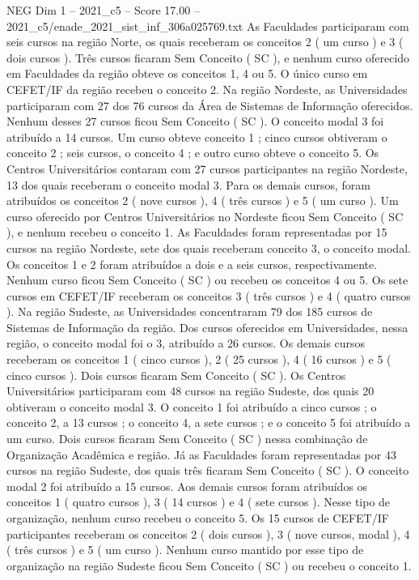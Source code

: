\begin{textsample}{NEG Dim 1 – 2021\_c5 – Score 17.00 – 2021\_c5/enade\_2021\_sist\_inf\_306a025769.txt}
As Faculdades participaram com seis cursos na região Norte, os quais receberam os conceitos 2 ( um curso ) e 3 ( dois cursos ).
Três cursos ficaram Sem Conceito ( SC ), e nenhum curso oferecido em Faculdades da região obteve os conceitos 1, 4 ou 5.
O único curso em CEFET/IF da região recebeu o conceito 2.
Na região Nordeste, as Universidades participaram com 27 dos 76 cursos da Área de Sistemas de Informação oferecidos.
Nenhum desses 27 cursos ficou Sem Conceito ( SC ).
O conceito modal 3 foi atribuído a 14 cursos.
Um curso obteve conceito 1 ; cinco cursos obtiveram o conceito 2 ; seis cursos, o conceito 4 ; e outro curso obteve o conceito 5.
Os Centros Universitários contaram com 27 cursos participantes na região Nordeste, 13 dos quais receberam o conceito modal 3.
Para os demais cursos, foram atribuídos os conceitos 2 ( nove cursos ), 4 ( três cursos ) e 5 ( um curso ).
Um curso oferecido por Centros Universitários no Nordeste ficou Sem Conceito ( SC ), e nenhum recebeu o conceito 1.
As Faculdades foram representadas por 15 cursos na região Nordeste, sete dos quais receberam conceito 3, o conceito modal.
Os conceitos 1 e 2 foram atribuídos a dois e a seis cursos, respectivamente.
Nenhum curso ficou Sem Conceito ( SC ) ou recebeu os conceitos 4 ou 5.
Os sete cursos em CEFET/IF receberam os conceitos 3 ( três cursos ) e 4 ( quatro cursos ).
Na região Sudeste, as Universidades concentraram 79 dos 185 cursos de Sistemas de Informação da região.
Dos cursos oferecidos em Universidades, nessa região, o conceito modal foi o 3, atribuído a 26 cursos.
Os demais cursos receberam os conceitos 1 ( cinco cursos ), 2 ( 25 cursos ), 4 ( 16 cursos ) e 5 ( cinco cursos ).
Dois cursos ficaram Sem Conceito ( SC ).
Os Centros Universitários participaram com 48 cursos na região Sudeste, dos quais 20 obtiveram o conceito modal 3.
O conceito 1 foi atribuído a cinco cursos ; o conceito 2, a 13 cursos ; o conceito 4, a sete cursos ; e o conceito 5 foi atribuído a um curso.
Dois cursos ficaram Sem Conceito ( SC ) nessa combinação de Organização Acadêmica e região.
Já as Faculdades foram representadas por 43 cursos na região Sudeste, dos quais três ficaram Sem Conceito ( SC ).
O conceito modal 2 foi atribuído a 15 cursos.
Aos demais cursos foram atribuídos os conceitos 1 ( quatro cursos ), 3 ( 14 cursos ) e 4 ( sete cursos ).
Nesse tipo de organização, nenhum curso recebeu o conceito 5.
Os 15 cursos de CEFET/IF participantes receberam os conceitos 2 ( dois cursos ), 3 ( nove cursos, modal ), 4 ( três cursos ) e 5 ( um curso ).
Nenhum curso mantido por esse tipo de organização na região Sudeste ficou Sem Conceito ( SC ) ou recebeu o conceito 1.

\end{textsample}
